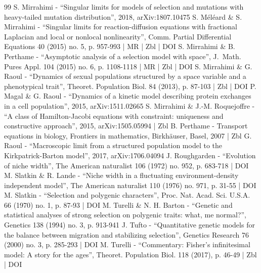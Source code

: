 \documentclass[10pt]{amsart}
\theoremstyle{plain}
\theoremstyle{definition}
\begin{document}
\begin{thebibliography}{99}
S. Mirrahimi - “Singular limits for models of selection and mutations with heavy-tailed mutation distribution”, 2018, arXiv:1807.10475
S. Méléard \& S. Mirrahimi - “Singular limits for reaction-diffusion equations with fractional Laplacian and local or nonlocal nonlinearity”, Comm. Partial Differential Equations 40 (2015) no. 5, p. 957-993 | MR | Zbl | DOI
S. Mirrahimi \& B. Perthame - “Asymptotic analysis of a selection model with space”, J. Math. Pures Appl. 104 (2015) no. 6, p. 1108-1118 | MR | Zbl | DOI
S. Mirrahimi \& G. Raoul - “Dynamics of sexual populations structured by a space variable and a phenotypical trait”, Theoret. Population Biol. 84 (2013), p. 87-103 | Zbl | DOI
P. Magal \& G. Raoul - “Dynamics of a kinetic model describing protein exchanges in a cell population”, 2015, arXiv:1511.02665
S. Mirrahimi \& J.-M. Roquejoffre - “A class of Hamilton-Jacobi equations with constraint: uniqueness and constructive approach”, 2015, arXiv:1505.05994 | Zbl
B. Perthame - Transport equations in biology, Frontiers in mathematics, Birkhäuser, Basel, 2007 | Zbl
G. Raoul - “Macroscopic limit from a structured population model to the Kirkpatrick-Barton model”, 2017, arXiv:1706.04094
J. Roughgarden - “Evolution of niche width”, The American naturalist 106 (1972) no. 952, p. 683-718 | DOI
M. Slatkin \& R. Lande - “Niche width in a fluctuating environment-density independent model”, The American naturalist 110 (1976) no. 971, p. 31-55 | DOI
M. Slatkin - “Selection and polygenic characters”, Proc. Nat. Acad. Sci. U.S.A. 66 (1970) no. 1, p. 87-93 | DOI
M. Turelli \& N. H. Barton - “Genetic and statistical analyses of strong selection on polygenic traits: what, me normal?”, Genetics 138 (1994) no. 3, p. 913-941
J. Tufto - “Quantitative genetic models for the balance between migration and stabilizing selection”, Genetics Research 76 (2000) no. 3, p. 285-293 | DOI
M. Turelli - “Commentary: Fisher’s infinitesimal model: A story for the ages”, Theoret. Population Biol. 118 (2017), p. 46-49 | Zbl | DOI
\end{thebibliography}
\end{document}
